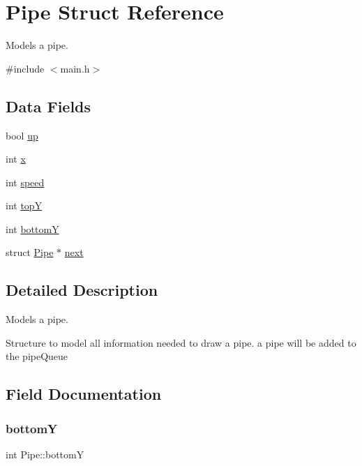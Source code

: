 \hypertarget{struct_pipe}{}\section{Pipe Struct Reference}
\label{struct_pipe}


Models a pipe.  




{\ttfamily \#include $<$main.\+h$>$}

\subsection*{Data Fields}
\begin{DoxyCompactItemize}
\item 
bool \hyperlink{struct_pipe_a7e5ae0dd02b0eda1da8c877e7fefa997}{up}
\item 
int \hyperlink{struct_pipe_ad9a022a035c93f68117d6b671a57a68b}{x}
\item 
int \hyperlink{struct_pipe_a94d42f9c582423433b7039466579a493}{speed}
\item 
int \hyperlink{struct_pipe_a33248541bebc39fb7e699a495ac2efee}{topY}
\item 
int \hyperlink{struct_pipe_aa6f12d7f544f90d50fde8f728730a59c}{bottomY}
\item 
struct \hyperlink{struct_pipe}{Pipe} $\ast$ \hyperlink{struct_pipe_a98ef5d289100cfe967a4db2c83b8b7d1}{next}
\end{DoxyCompactItemize}


\subsection{Detailed Description}
Models a pipe. 

Structure to model all information needed to draw a pipe. a pipe will be added to the pipe\+Queue 

\subsection{Field Documentation}
\mbox{\label{struct_pipe_aa6f12d7f544f90d50fde8f728730a59c}} 
\subsubsection{\texorpdfstring{bottomY}{bottomY}}
{\footnotesize\ttfamily int Pipe\+::bottomY}

